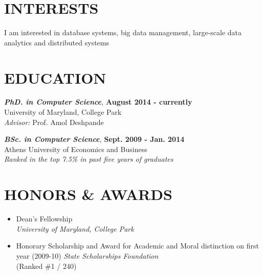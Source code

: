 \documentclass[margin, 10pt]{res} %
\begin{document}
\begin{resume}


\section{INTERESTS}

I am interested in database systems, big data management, large-scale data analytics and distributed systems


\section{EDUCATION}

{\sl \textbf{PhD. in Computer Science},}  \hfill \textbf{August 2014 - currently} \\
University of Maryland, College Park\\
\textit{Advisor:} Prof. Amol Deshpande

{\sl \textbf{BSc. in Computer Science},}  \hfill \textbf{Sept. 2009 - Jan. 2014} \\
Athens University of Economics and Business\\
\textit{Ranked in the top 7.5\% in past five years of graduates}



\section{HONORS \& AWARDS}

\begin{itemize}
  \item Dean's Fellowship \\
  \textit{University of Maryland, College Park}
  \item Honorary Scholarship and Award for Academic and Moral distinction on first year (2009-10)
 \textit{State Scholarships Foundation}\\
 (Ranked \#1 / 240)
\end{itemize}


\end{resume}
\end{document}
